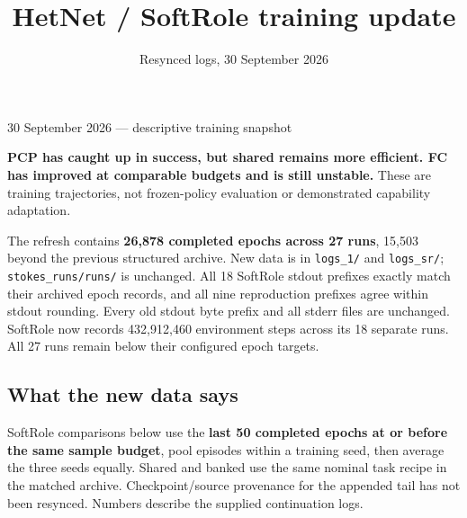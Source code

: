 \documentclass[
  10pt,
]{article}
\title{HetNet / SoftRole training update}
\author{}
\date{Resynced logs, 30 September 2026}
\begin{document}
\maketitle

30 September 2026 --- descriptive training snapshot

\textbf{PCP has caught up in success, but shared remains more efficient.
FC has improved at comparable budgets and is still unstable.} These are
training trajectories, not frozen-policy evaluation or demonstrated
capability adaptation.

The refresh contains \textbf{26,878 completed epochs across 27 runs},
15,503 beyond the previous structured archive. New data is in
\texttt{logs\_1/} and \texttt{logs\_sr/}; \texttt{stokes\_runs/runs/} is
unchanged. All 18 SoftRole stdout prefixes exactly match their archived
epoch records, and all nine reproduction prefixes agree within stdout
rounding. Every old stdout byte prefix and all stderr files are
unchanged. SoftRole now records 432,912,460 environment steps across its
18 separate runs. All 27 runs remain below their configured epoch
targets.

\subsection{What the new data says}\label{what-the-new-data-says}

SoftRole comparisons below use the \textbf{last 50 completed epochs at
or before the same sample budget}, pool episodes within a training seed,
then average the three seeds equally. Shared and banked use the same
nominal task recipe in the matched archive. Checkpoint/source provenance
for the appended tail has not been resynced. Numbers describe the
supplied continuation logs.
\end{document}
